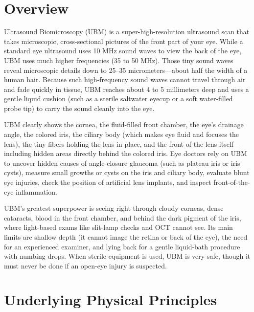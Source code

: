 \label{ch:infographic-ubm}

\section{Overview}

Ultrasound Biomicroscopy (UBM) is a super-high-resolution ultrasound scan that takes microscopic, cross-sectional pictures of the front part of your eye. While a standard eye ultrasound uses 10 MHz sound waves to view the back of the eye, UBM uses much higher frequencies (35 to 50 MHz). Those tiny sound waves reveal microscopic details down to 25--35 micrometers---about half the width of a human hair. Because such high-frequency sound waves cannot travel through air and fade quickly in tissue, UBM reaches about 4 to 5 millimeters deep and uses a gentle liquid cushion (such as a sterile saltwater eyecup or a soft water-filled probe tip) to carry the sound cleanly into the eye.

UBM clearly shows the cornea, the fluid-filled front chamber, the eye's drainage angle, the colored iris, the ciliary body (which makes eye fluid and focuses the lens), the tiny fibers holding the lens in place, and the front of the lens itself---including hidden areas directly behind the colored iris. Eye doctors rely on UBM to uncover hidden causes of angle-closure glaucoma (such as plateau iris or iris cysts), measure small growths or cysts on the iris and ciliary body, evaluate blunt eye injuries, check the position of artificial lens implants, and inspect front-of-the-eye inflammation.

UBM's greatest superpower is seeing right through cloudy corneas, dense cataracts, blood in the front chamber, and behind the dark pigment of the iris, where light-based exams like slit-lamp checks and OCT cannot see. Its main limits are shallow depth (it cannot image the retina or back of the eye), the need for an experienced examiner, and lying back for a gentle liquid-bath procedure with numbing drops. When sterile equipment is used, UBM is very safe, though it must never be done if an open-eye injury is suspected.

\section{Underlying Physical Principles}

